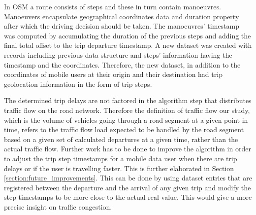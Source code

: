 \documentclass[12pt, a4paper]{report}
\theoremstyle{definition}
\theoremstyle{definition}%
\theoremstyle{definition}%
\theoremstyle{definition}%
\theoremstyle{definition}%
\theoremstyle{definition}%
\begin{document}
In OSM a route consists of steps and these in turn contain manoeuvres. Manoeuvers encapsulate geographical coordinates data and duration property after which the driving decision should be taken. The manoeuvres' timestamp was computed by accumulating the duration of the previous steps and adding the final total offset to the trip departure timestamp. A new dataset was created with records including previous data structure and steps' information having the timestamp and the coordinates. Therefore, the new dataset, in addition to the coordinates of mobile users at their origin and their destination had trip geolocation information in the form of trip steps. 

The determined trip delays are not factored in the algorithm step that distributes traffic flow on the road network. Therefore the definition of traffic flow our study, which is the volume of vehicles going through a road segment at a given point in time, refers to the traffic flow load expected to be handled by the road segment based on a given set of calculated departures at a given time, rather than the actual traffic flow.   Further work has to be done to improve the algorithm in order to adjust the trip step timestamps for a mobile data user when there are trip delays or if the user is travelling faster. This is further elaborated in Section \ref{section:future_improvements}. This can be done by using dataset entries that are registered between the departure and the arrival of any given trip and modify the step timestamps to be more close to the actual real value. This would give a more precise insight on traffic congestion.
 
\end{document}

